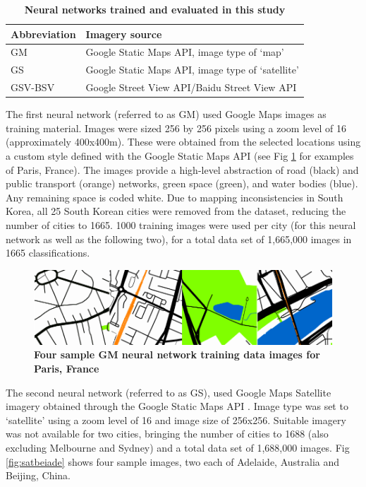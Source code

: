 \documentclass[Crown,sageh,times]{sagej}
\begin{document}
\begin{table}[!htbp]
\caption{\bf Neural networks trained and evaluated in this study \label{tab:neuralnetworks}}     
\begin{tabular}{ l l }
 \hline Abbreviation   &  Imagery source \\ \hline
GM & Google Static Maps API, image type of `map'     \\ 
GS & Google Static Maps API, image type of `satellite'      \\
GSV-BSV & Google Street View API/Baidu Street View API     \\ \hline

\end{tabular}
\end{table}

The first neural network (referred to as GM) used Google Maps images as training material. Images were sized 256 by 256 pixels using a zoom level of 16 (approximately 400x400m). These were obtained from the selected locations using a custom style defined with the Google Static Maps API \cite{GoogleStatic2017} (see Fig \ref{fig:maps} for examples of Paris, France). The images provide a high-level abstraction of road (black) and public transport (orange) networks, green space (green), and water bodies (blue). Any remaining space is coded white. Due to mapping inconsistencies in South Korea, all 25 South Korean cities were removed from the dataset, reducing the number of cities to 1665. 1000 training images were used per city (for this neural network as well as the following two), for a total data set of 1,665,000 images in 1665 classifications. 



\begin{figure}[!htbp]
    \centering    
\includegraphics[scale=1]{Images/PlosOne/Fig2.png}  
\caption{\bf Four sample GM neural network training data images for Paris, France \cite{GoogleStatic2017}}    
 \label{fig:maps}  
\end{figure} 


The second neural network (referred to as GS), used Google Maps Satellite imagery obtained through the Google Static Maps API \cite{GoogleStatic2017}. Image type was set to `satellite' using a zoom level of 16 and image size of 256x256. Suitable imagery was not available for two cities, bringing the number of cities to 1688 (also excluding Melbourne and Sydney) and a total data set of 1,688,000 images. Fig \ref{fig:satbeiade} shows four sample images, two each of Adelaide, Australia and Beijing, China. 
\end{document}
